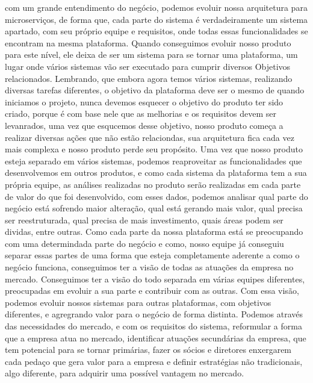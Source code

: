       com um grande entendimento do negócio, podemos evoluir nossa arquitetura para
      microserviços, de forma que, cada parte do sistema é verdadeiramente um sistema
      apartado, com seu próprio equipe e requisitos, onde todas essas funcionalidades
      se encontram na mesma plataforma. Quando conseguimos evoluir nosso produto
      para este nível, ele deixa de ser um sistema para se tornar uma plataforma,
      um lugar onde vários sistemas vão ser executado para cumprir diversos Objetivos
      relacionados. Lembrando, que embora agora temos vários sistemas, realizando
      diversas tarefas diferentes, o objetivo da plataforma deve ser o mesmo de
      quando iniciamos o projeto, nunca devemos esquecer o objetivo do produto ter
      sido criado, porque é com base nele que as melhorias e os requisitos devem ser
      levanrados, uma vez que esqucemos desse objetivo, nosso produto começa a
      realizar diversas ações que não estão relaciondas, sua arquitetura fica cada
      vez mais complexa e nosso produto perde seu propósito. \newline
      Uma vez que nosso produto esteja separado em vários sistemas, podemos reaproveitar
      as funcionalidades que desenvolvemos em outros produtos, e como cada sistema
      da plataforma tem a sua própria equipe, as análises realizadas no produto
      serão realizadas em cada parte de valor do que foi desenvolvido, com esses
      dados, podemos analisar qual parte do negócio está sofrendo maior alteração,
      qual está gerando mais valor, qual precisa ser reestruturada, qual precisa
      de mais investimento, quais áreas podem ser dividas, entre outras. Como
      cada parte da nossa plataforma está se preocupando com uma determindada parte
      do negócio e como, nosso equipe já conseguiu separar essas partes de uma forma
      que esteja completamente aderente a como o negócio funciona, conseguimos ter
      a visão de todas as atuações da empresa no mercado. Conseguimos ter a visão
      do todo separada em várias equipes diferentes, preocupadas em evoluir a sua
      parte e contribuir com as outras. Com essa visão, podemos evoluir nossos
      sistemas para outras plataformas, com objetivos diferentes, e agregrando
      valor para o negócio de forma distinta. Podemos através das necessidades do
      mercado, e com os requisitos do sistema, reformular a forma que a empresa
      atua no mercado, identificar atuações secundárias da empresa, que tem potencial
      para se tornar primárias, fazer os sócios e diretores enxergarem cada pedaço
      que gera valor para a empresa e definir estratégias não tradicionais, algo
      diferente, para adquirir uma possível vantagem no mercado.

